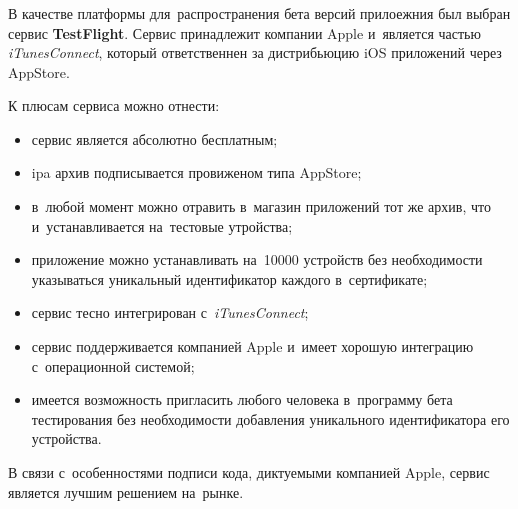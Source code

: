 \subsubsection{}
\label{sec:testing:ci:testflight}

В качестве платформы для~распространения бета версий прилоежния был выбран сервис \textbf{TestFlight}. Сервис принадлежит компании Apple и~является частью \textit{iTunesConnect}, который ответственнен за дистрибьюцию iOS приложений через AppStore.

К плюсам сервиса можно отнести:

\begin{itemize}
	\item сервис является абсолютно бесплатным;
	\item ipa архив подписывается провиженом типа AppStore;
	\item в~любой момент можно отравить в~магазин приложений тот же архив, что и~устанавливается на~тестовые утройства;
	\item приложение можно устанавливать на~\num{10000} устройств без необходимости указываться уникальный идентификатор каждого в~сертификате;
	\item сервис тесно интегрирован с~\textit{iTunesConnect};
	\item сервис поддерживается компанией Apple и~имеет хорошую интеграцию с~операционной системой;
	\item имеется возможность пригласить любого человека в~программу бета тестирования без необходимости добавления уникального идентификатора его устройства.
\end{itemize}

В связи с~особенностями подписи кода, диктуемыми компанией Apple, сервис является лучшим решением на~рынке.
